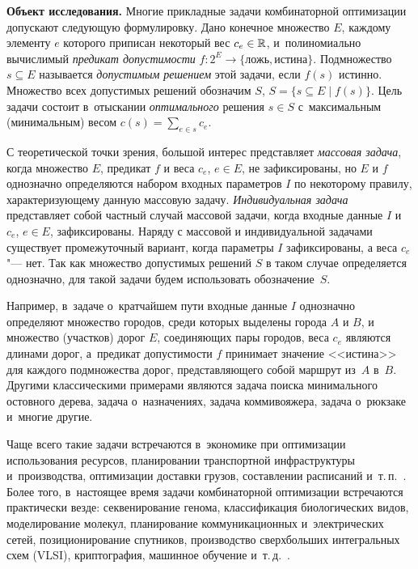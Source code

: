 
\textbf{Объект исследования.}
Многие прикладные задачи комбинаторной оптимизации допускают следующую формулировку.
Дано конечное множество $E$, каждому элементу $e$ которого приписан некоторый вес $c_e \in \mathbb{R}$, и~полиномиально вычислимый \emph{предикат допустимости} $f \colon 2^E \to \{\text{ложь}, \text{истина}\}$.
Подмножество $s \subseteq E$ называется \emph{допустимым решением} этой задачи, если $f(s)$ истинно.
Множество всех допустимых решений обозначим $S$, $S = \{s \subseteq E \mid f(s)\}$.
Цель задачи состоит в~отыскании \emph{оптимального} решения $s \in S$ с~максимальным (минимальным) весом $c(s) = \sum_{e \in s} c_e$.

С теоретической точки зрения, большой интерес представляет \emph{массовая задача}, когда множество $E$, предикат $f$ и веса $c_e$, $e\in E$, не зафиксированы, но $E$ и $f$ однозначно определяются набором входных параметров $I$ по некоторому правилу, характеризующему данную массовую задачу. \emph{Индивидуальная задача} представляет собой частный случай массовой задачи, когда входные данные $I$ и $c_e$, $e \in E$, зафиксированы.
Наряду с массовой и индивидуальной задачами существует промежуточный вариант, когда параметры $I$ зафиксированы, а веса $c_e$ "--- нет.
Так как множество допустимых решений $S$ в таком случае определяется однозначно, для такой задачи будем использовать обозначение~$S$.

Например, в~задаче о~кратчайшем пути входные данные $I$ однозначно определяют множество городов, среди которых выделены города $A$ и $B$, и множество (участков) дорог $E$, соединяющих пары городов, веса $c_e$ являются длинами дорог, а~предикат допустимости $f$ принимает значение <<истина>> для каждого подмножества дорог, представляющего собой маршрут из~$A$ в~$B$.
Другими классическими примерами являются задача поиска минимального остовного дерева, задача о~назначениях, задача коммивояжера, задача о~рюкзаке и~многие другие.

Чаще всего такие задачи встречаются в~экономике при оптимизации использования ресурсов,
планировании транспортной инфраструктуры и~производства, оптимизации доставки грузов, составлении расписаний и~т.\,п.~\cite{Paschos:2014}. 
Более того, в~настоящее время задачи комбинаторной оптимизации встречаются практически везде: 
секвенирование генома, классификация биологических видов, моделирование молекул, 
планирование коммуникационных и~электрических сетей, позиционирование спутников,
производство сверхбольших интегральных схем (VLSI), %
криптография, машинное обучение и~т.\,д.~\cite{GrotschelCO:1995}.

